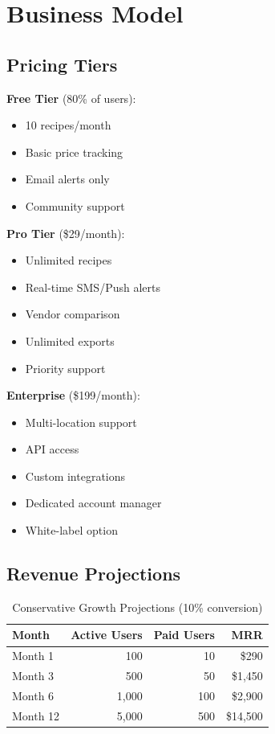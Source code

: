 \documentclass[11pt,a4paper]{article}
\begin{document}
\section{Business Model}

\subsection{Pricing Tiers}

\textbf{Free Tier} (80\% of users):
\begin{itemize}
    \item 10 recipes/month
    \item Basic price tracking
    \item Email alerts only
    \item Community support
\end{itemize}

\textbf{Pro Tier} (\$29/month):
\begin{itemize}
    \item Unlimited recipes
    \item Real-time SMS/Push alerts
    \item Vendor comparison
    \item Unlimited exports
    \item Priority support
\end{itemize}

\textbf{Enterprise} (\$199/month):
\begin{itemize}
    \item Multi-location support
    \item API access
    \item Custom integrations
    \item Dedicated account manager
    \item White-label option
\end{itemize}

\subsection{Revenue Projections}
\begin{table}[h]
\centering
\begin{tabular}{@{}lrrr@{}}
\toprule
\textbf{Month} & \textbf{Active Users} & \textbf{Paid Users} & \textbf{MRR} \\
\midrule
Month 1 & 100 & 10 & \$290 \\
Month 3 & 500 & 50 & \$1,450 \\
Month 6 & 1,000 & 100 & \$2,900 \\
Month 12 & 5,000 & 500 & \$14,500 \\
\bottomrule
\end{tabular}
\caption{Conservative Growth Projections (10\% conversion)}
\end{table}
\end{document}
